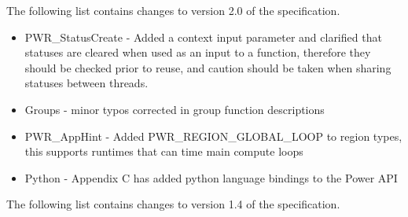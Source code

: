 The following list contains changes to version 2.0 of the specification.
\begin{itemize}
  \item{PWR_StatusCreate - Added a context input parameter and clarified that statuses are cleared when used as an input to a function, therefore they should be checked prior to reuse, and caution should be taken when sharing statuses between threads.}
  \item{Groups - minor typos corrected in group function descriptions}
  \item{PWR_AppHint - Added PWR_REGION_GLOBAL_LOOP to region types, this supports runtimes that can time main compute loops}
  \item{Python - Appendix C has added python language bindings to the Power API}

\end{itemize}


The following list contains changes to version 1.4 of the specification.

